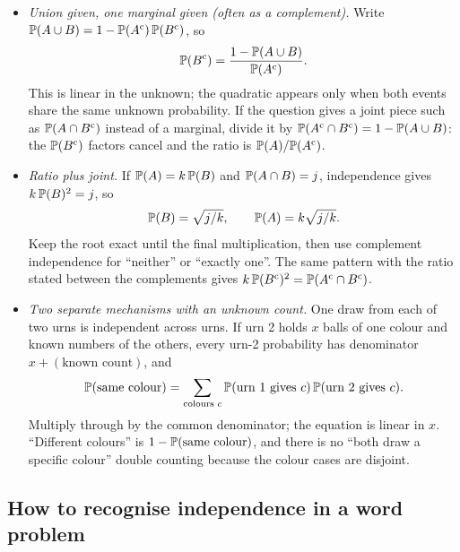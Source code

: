 \begin{keyfact}
\begin{itemize}[nosep]
\item \emph{Union given, one marginal given (often as a complement).} Write $\mathbb{P}(A \cup B) = 1 - \mathbb{P}(A^{\mathrm{c}})\,\mathbb{P}(B^{\mathrm{c}})$, so
\[
\mathbb{P}(B^{\mathrm{c}}) = \frac{1 - \mathbb{P}(A \cup B)}{\mathbb{P}(A^{\mathrm{c}})}.
\]
This is linear in the unknown; the quadratic appears only when both events share the same unknown probability. If the question gives a joint piece such as $\mathbb{P}(A \cap B^{\mathrm{c}})$ instead of a marginal, divide it by $\mathbb{P}(A^{\mathrm{c}} \cap B^{\mathrm{c}}) = 1 - \mathbb{P}(A \cup B)$: the $\mathbb{P}(B^{\mathrm{c}})$ factors cancel and the ratio is $\mathbb{P}(A)/\mathbb{P}(A^{\mathrm{c}})$.
\item \emph{Ratio plus joint.} If $\mathbb{P}(A) = k\,\mathbb{P}(B)$ and $\mathbb{P}(A \cap B) = j$, independence gives $k\,\mathbb{P}(B)^2 = j$, so
\[
\mathbb{P}(B) = \sqrt{j/k}, \qquad \mathbb{P}(A) = k\sqrt{j/k}.
\]
Keep the root exact until the final multiplication, then use complement independence for ``neither'' or ``exactly one''. The same pattern with the ratio stated between the complements gives $k\,\mathbb{P}(B^{\mathrm{c}})^2 = \mathbb{P}(A^{\mathrm{c}} \cap B^{\mathrm{c}})$.
\item \emph{Two separate mechanisms with an unknown count.} One draw from each of two urns is independent across urns. If urn 2 holds $x$ balls of one colour and known numbers of the others, every urn-2 probability has denominator $x + (\text{known count})$, and
\[
\mathbb{P}(\text{same colour}) = \sum_{\text{colours } c} \mathbb{P}(\text{urn 1 gives } c)\,\mathbb{P}(\text{urn 2 gives } c).
\]
Multiply through by the common denominator; the equation is linear in $x$. ``Different colours'' is $1 - \mathbb{P}(\text{same colour})$, and there is no ``both draw a specific colour'' double counting because the colour cases are disjoint.
\end{itemize}
\end{keyfact}

\subsection{How to recognise independence in a word problem}

